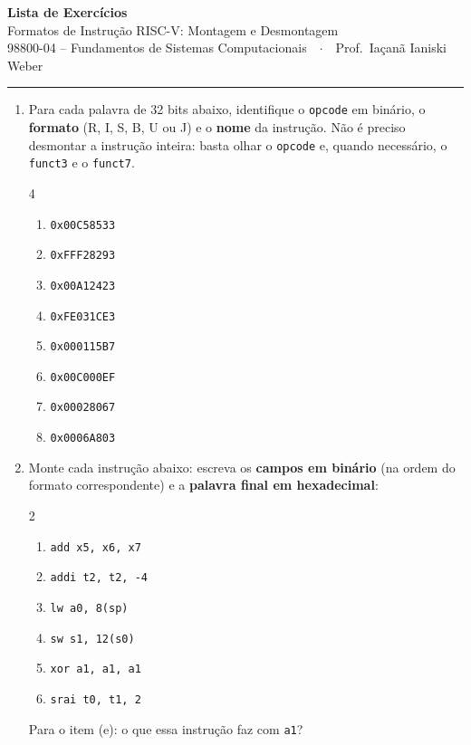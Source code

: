\documentclass[11pt, a4paper]{article}
\begin{document}
\begin{center}
  {\Large \textbf{Lista de Exerc\'{i}cios}}\\[2pt]
  {\large Formatos de Instru\c{c}\~{a}o RISC-V: Montagem e Desmontagem}\\[3pt]
  {\normalsize 98800-04 -- Fundamentos de Sistemas Computacionais\ \ $\cdot$\ \ Prof.\ Ia\c{c}an\~{a} Ianiski Weber}
\end{center}

\vspace{1pt}
\hrule
\vspace{5pt}

\begin{enumerate}

\item Para cada palavra de 32 bits abaixo, identifique o \texttt{opcode} em bin\'{a}rio, o \textbf{formato} (R, I, S, B, U ou J) e o \textbf{nome} da instru\c{c}\~{a}o. N\~{a}o \'{e} preciso desmontar a instru\c{c}\~{a}o inteira: basta olhar o \texttt{opcode} e, quando necess\'{a}rio, o \texttt{funct3} e o \texttt{funct7}.

\begin{multicols}{4}
\begin{enumerate}
  \item \texttt{0x00C58533}
  \item \texttt{0xFFF28293}
  \item \texttt{0x00A12423}
  \item \texttt{0xFE031CE3}
  \item \texttt{0x000115B7}
  \item \texttt{0x00C000EF}
  \item \texttt{0x00028067}
  \item \texttt{0x0006A803}
\end{enumerate}
\end{multicols}

\item Monte cada instru\c{c}\~{a}o abaixo: escreva os \textbf{campos em bin\'{a}rio} (na ordem do formato correspondente) e a \textbf{palavra final em hexadecimal}:
\begin{multicols}{2}
\begin{enumerate}
  \item \texttt{add x5, x6, x7}
  \item \texttt{addi t2, t2, -4}
  \item \texttt{lw a0, 8(sp)}
  \item \texttt{sw s1, 12(s0)}
  \item \texttt{xor a1, a1, a1}
  \item \texttt{srai t0, t1, 2}
\end{enumerate}
\end{multicols}
Para o item (e): o que essa instru\c{c}\~{a}o faz com \texttt{a1}?


\end{enumerate}
\end{document}

